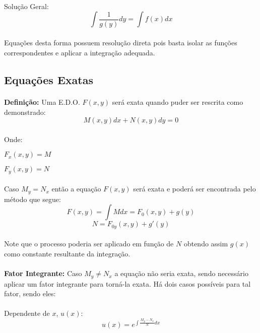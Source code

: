 \documentclass{article}
\begin{document}
\begin{enumerate}[rightmargin = \leftmargin]
        \paragraph{}Solução Geral:
            \[\int{\frac{1}{g(y)}dy} = \int{f(x)dx}\]
        \paragraph{}Equações desta forma possuem resolução direta pois basta isolar as funções correspondentes e aplicar a integração adequada.
    
    \subsection{Equações Exatas}
        \paragraph{}\textbf{Definição:} Uma E.D.O. $F(x,y)$ será exata quando puder ser rescrita como demonstrado:
            \[M(x,y)dx+N(x,y)dy=0\]
        \paragraph{}Onde:
        
        \quad$F_{x}(x,y)=M$
        
        \quad$F_{y}(x,y)=N$
        \paragraph{}Caso $M_{y}=N_{x}$ então a equação $F(x,y)$ será exata e poderá ser encontrada pelo método que segue:
            \[F(x,y)=\int{M}dx=F_{0}(x,y)+g(y)\]
            \[N= F_{0y}(x,y)+g'(y)\]
        \paragraph{}Note que o processo poderia ser aplicado em função de $N$ obtendo assim $g(x)$ como constante resultante da integração.
        \paragraph{}\textbf{Fator Integrante:} Caso $M_{y}\neq N_{x}$ a equação não seria exata, sendo necessário aplicar um fator integrante para torná-la exata. Há dois casos possíveis para tal fator, sendo eles:
        
        \paragraph{}Dependente de $x$, $u(x)$:
            \[u(x)=e^{\int{\frac{M_{y}-N_{x}}{N}dx}}\]

\end{enumerate}
\end{document}
